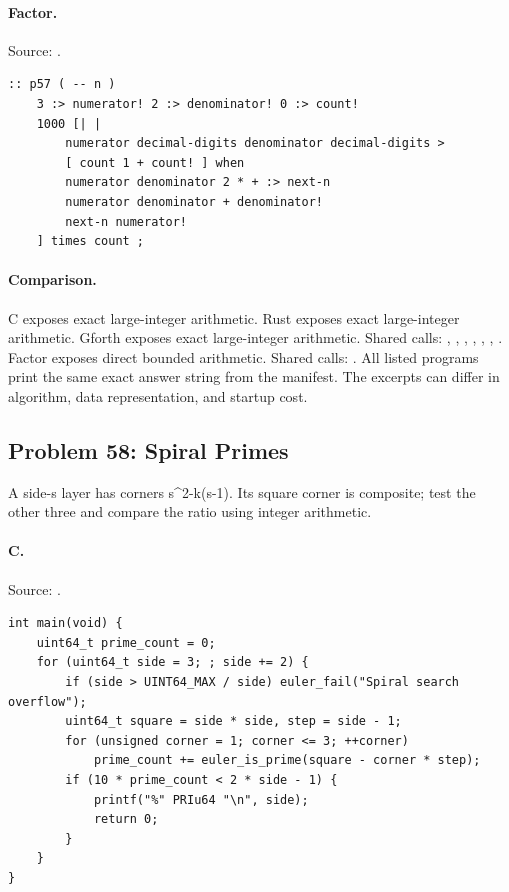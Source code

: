 \paragraph{Factor.} Source: .
\begin{lstlisting}
:: p57 ( -- n )
    3 :> numerator! 2 :> denominator! 0 :> count!
    1000 [| |
        numerator decimal-digits denominator decimal-digits >
        [ count 1 + count! ] when
        numerator denominator 2 * + :> next-n
        numerator denominator + denominator!
        next-n numerator!
    ] times count ;
\end{lstlisting}

\paragraph{Comparison.}
C exposes exact large-integer arithmetic. Rust exposes exact large-integer arithmetic. Gforth exposes exact large-integer arithmetic. Shared calls: \texttt{}, \texttt{}, \texttt{}, \texttt{}, \texttt{}, \texttt{}, \texttt{}. Factor exposes direct bounded arithmetic. Shared calls: \texttt{}.
All listed programs print the same exact answer string from the manifest. The excerpts can differ in algorithm, data representation, and startup cost.

\subsection{Problem 58: Spiral Primes}
\label{walkthrough:p58}
A side-s layer has corners s\textasciicircum{}2-k(s-1). Its square corner is composite; test the other three and compare the ratio using integer arithmetic.

\paragraph{C.} Source: .
\begin{lstlisting}
int main(void) {
    uint64_t prime_count = 0;
    for (uint64_t side = 3; ; side += 2) {
        if (side > UINT64_MAX / side) euler_fail("Spiral search overflow");
        uint64_t square = side * side, step = side - 1;
        for (unsigned corner = 1; corner <= 3; ++corner)
            prime_count += euler_is_prime(square - corner * step);
        if (10 * prime_count < 2 * side - 1) {
            printf("%" PRIu64 "\n", side);
            return 0;
        }
    }
}
\end{lstlisting}

